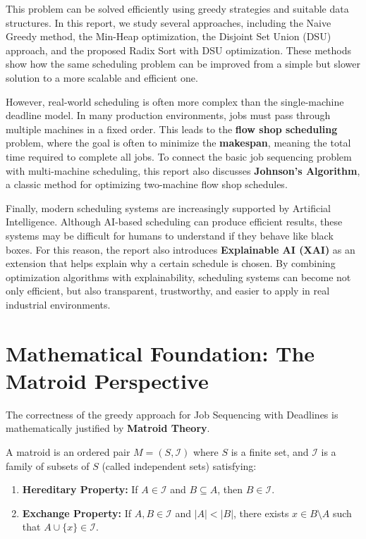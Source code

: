 \documentclass[11pt,a4paper]{article}
\begin{document}
This problem can be solved efficiently using greedy strategies and suitable data structures. In this report, we study several approaches, including the Naive Greedy method, the Min-Heap optimization, the Disjoint Set Union (DSU) approach, and the proposed Radix Sort with DSU optimization. These methods show how the same scheduling problem can be improved from a simple but slower solution to a more scalable and efficient one.

However, real-world scheduling is often more complex than the single-machine deadline model. In many production environments, jobs must pass through multiple machines in a fixed order. This leads to the \textbf{flow shop scheduling} problem, where the goal is often to minimize the \textbf{makespan}, meaning the total time required to complete all jobs. To connect the basic job sequencing problem with multi-machine scheduling, this report also discusses \textbf{Johnson's Algorithm}, a classic method for optimizing two-machine flow shop schedules.

Finally, modern scheduling systems are increasingly supported by Artificial Intelligence. Although AI-based scheduling can produce efficient results, these systems may be difficult for humans to understand if they behave like black boxes. For this reason, the report also introduces \textbf{Explainable AI (XAI)} as an extension that helps explain why a certain schedule is chosen. By combining optimization algorithms with explainability, scheduling systems can become not only efficient, but also transparent, trustworthy, and easier to apply in real industrial environments.

\section{Mathematical Foundation: The Matroid Perspective}
The correctness of the greedy approach for Job Sequencing with Deadlines is mathematically justified by \textbf{Matroid Theory}.

A matroid is an ordered pair $M = (S, \mathcal{I})$ where $S$ is a finite set, and $\mathcal{I}$ is a family of subsets of $S$ (called independent sets) satisfying:
\begin{enumerate}
    \item \textbf{Hereditary Property:} If $A \in \mathcal{I}$ and $B \subseteq A$, then $B \in \mathcal{I}$.
    \item \textbf{Exchange Property:} If $A, B \in \mathcal{I}$ and $|A| < |B|$, there exists $x \in B \setminus A$ such that $A \cup \{x\} \in \mathcal{I}$.
\end{enumerate}
\end{document}

